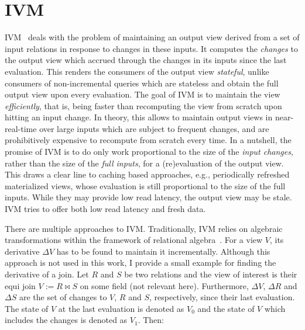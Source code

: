 \section{\Acl{IVM}}

\Acl{IVM}~\cite{gupta1995maintenance} deals with the problem of maintaining
an output view derived from a set of input relations in response to changes
in these inputs.
It computes the \emph{changes} to the output view which accrued through
the changes in its inputs since the last evaluation.
This renders the consumers of the output view \emph{stateful},
unlike consumers of non-incremental queries which are stateless
and obtain the full output view upon every evaluation.
The goal of \ac{IVM} is to maintain the view \emph{efficiently}, that is,
being faster than recomputing the view from scratch upon hitting an input change.
In theory, this allows to maintain output views in near-real-time over large
inputs which are subject to frequent changes, and are prohibitively expensive to
recompute from scratch every time.
In a nutshell, the promise of \ac{IVM} is to do only work proportional to the
size of the \emph{input changes}, rather than the size of the \emph{full inputs},
for a (re)evaluation of the output view.
This draws a clear line to caching based approaches, e.g., periodically
refreshed materialized views, whose evaluation is still proportional
to the size of the full inputs.
While they may provide low read latency, the output view may be stale.
\ac{IVM} tries to offer both low read latency and fresh data.

There are multiple approaches to \ac{IVM}.
Traditionally, \ac{IVM} relies on algebraic transformations within the framework
of relational algebra~\cite{gupta1995maintenance, gupta1993maintaining, pgivm}.
For a view \(V\), its derivative \(\Delta V\) has to be found to maintain
it incrementally.
Although this approach is not used in this work, I provide a small example
for finding the derivative of a join.
Let \(R\) and \(S\) be two relations and the view of interest is their
equi join \(V := R \bowtie S\) on some field (not relevant here).
Furthermore, \(\Delta V\), \(\Delta R\) and \(\Delta S\) are the set of changes
to \(V\), \(R\) and \(S\), respectively, since their last evaluation.
The state of \(V\) at the last evaluation is denoted as \(V_0\) and the
state of \(V\) which includes the changes is denoted as \(V_1\). Then:

